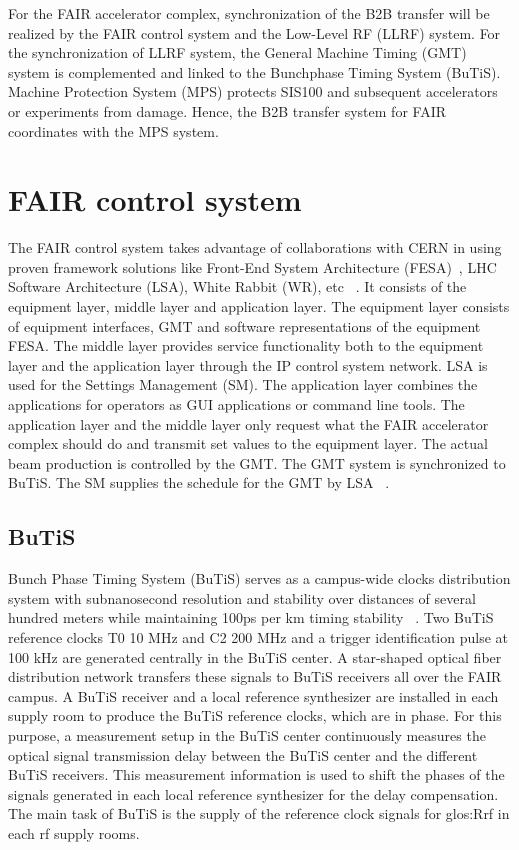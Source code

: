 
For the FAIR accelerator complex, synchronization of the B2B transfer will be realized by the FAIR control system and the Low-Level RF (LLRF) system. For the synchronization of LLRF system, the General Machine Timing (\gls{GMT}) system is complemented and linked to the Bunchphase Timing System (BuTiS). Machine Protection System (MPS) protects SIS100 and subsequent accelerators or experiments from damage. Hence, the B2B transfer system for FAIR coordinates with the MPS system. 
\section{FAIR control system}
The \gls{FAIR} control system takes advantage of collaborations with CERN in using proven framework solutions like Front-End System Architecture (\gls{FESA})~\cite{hoffmann_fesafront-end_2008}, LHC Software Architecture (\gls{LSA}), White Rabbit (\gls{WR}), etc ~\cite{huhmann_fair_2013}. It consists of the equipment layer, middle layer and application layer. The equipment layer consists of equipment interfaces, GMT and software representations of the equipment FESA. The middle layer provides service functionality both to the equipment layer and the application layer through the IP control system network. LSA is used for the Settings Management (SM). The application layer combines the applications for operators as \gls{GUI} applications or command line tools. The application layer and the middle layer only request what the FAIR accelerator complex should do and transmit set values to the equipment layer. The actual beam production is controlled by the GMT. The GMT system is synchronized to BuTiS. The \gls{SM} supplies the schedule for the GMT by LSA ~\cite{huhmann_fair_2013, beck_new_2012}.

\subsection{BuTiS}
Bunch Phase Timing System (BuTiS) serves as a campus-wide clocks distribution system with subnanosecond resolution and stability over distances of several hundred meters while maintaining 100ps per km timing stability ~\cite{moritz_butisdevelopment_2006}. Two BuTiS reference clocks T0 10 MHz and C2 200 MHz and a trigger identification pulse at 100 kHz are generated centrally in the BuTiS center. A star-shaped optical fiber distribution network transfers these signals to BuTiS receivers all over the FAIR campus. A BuTiS receiver and a local reference synthesizer are installed in each supply room to produce the BuTiS reference clocks, which are in phase. For this purpose, a measurement setup in the BuTiS center continuously measures the optical signal transmission delay between the BuTiS center and the different BuTiS receivers. This measurement information is used to shift the phases of the signals generated in each local reference synthesizer for the delay compensation. The main task of BuTiS is the supply of the reference clock signals for \gls{glos:Rrf} in each rf supply rooms. ~\cite{moritz_butisdevelopment_2006, zipfel_recent_2011}

